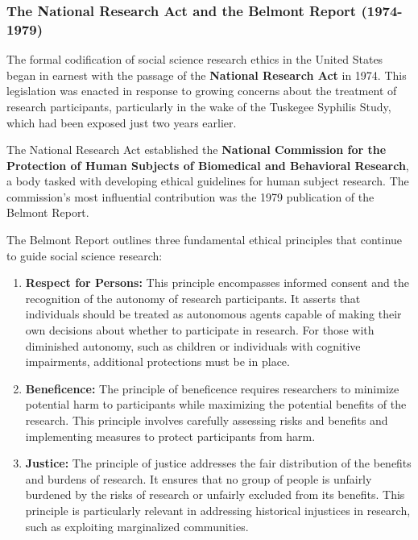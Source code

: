 \documentclass[
]{book}
\begin{document}
\subsubsection*{The National Research Act and the Belmont Report (1974-1979)}\label{the-national-research-act-and-the-belmont-report-1974-1979}

The formal codification of social science research ethics in the United States began in earnest with the passage of the \textbf{National Research Act} in 1974. This legislation was enacted in response to growing concerns about the treatment of research participants, particularly in the wake of the Tuskegee Syphilis Study, which had been exposed just two years earlier.

The National Research Act established the \textbf{National Commission for the Protection of Human Subjects of Biomedical and Behavioral Research}, a body tasked with developing ethical guidelines for human subject research. The commission's most influential contribution was the 1979 publication of the Belmont Report.

The Belmont Report outlines three fundamental ethical principles that continue to guide social science research:

\begin{enumerate}
\def\labelenumi{\arabic{enumi}.}
\item
  \textbf{Respect for Persons:} This principle encompasses informed consent and the recognition of the autonomy of research participants. It asserts that individuals should be treated as autonomous agents capable of making their own decisions about whether to participate in research. For those with diminished autonomy, such as children or individuals with cognitive impairments, additional protections must be in place.
\item
  \textbf{Beneficence:} The principle of beneficence requires researchers to minimize potential harm to participants while maximizing the potential benefits of the research. This principle involves carefully assessing risks and benefits and implementing measures to protect participants from harm.
\item
  \textbf{Justice:} The principle of justice addresses the fair distribution of the benefits and burdens of research. It ensures that no group of people is unfairly burdened by the risks of research or unfairly excluded from its benefits. This principle is particularly relevant in addressing historical injustices in research, such as exploiting marginalized communities.
\end{enumerate}
\end{document}
